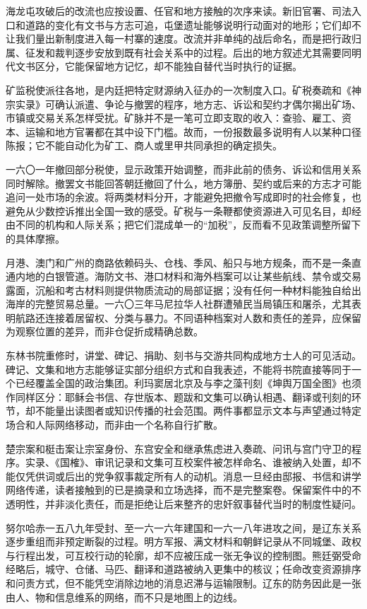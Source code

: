 海龙屯攻破后的改流也应按设置、任官和地方接触的次序来读。新旧官署、司法入口和道路的变化有文书与方志可追，屯堡遗址能够说明行动面对的地形；它们却不让我们量出新制度进入每一村寨的速度。改流并非单纯的战后命名，而是把行政归属、征发和裁判逐步安放到既有社会关系中的过程。后出的地方叙述尤其需要同明代文书区分，它能保留地方记忆，却不能独自替代当时执行的证据。

矿监税使派往各地，是内廷把特定财源纳入征办的一次制度入口。矿税奏疏和《神宗实录》可确认派遣、争论与撤罢的程序，地方志、诉讼和契约才偶尔揭出矿场、市镇或交易关系怎样受扰。矿脉并不是一笔可立即支取的收入：查验、雇工、资本、运输和地方官署都在其中设下门槛。故而，一份报数最多说明有人以某种口径陈报；它不能自动化为矿工、商人或里甲共同承担的确定损失。

一六〇一年撤回部分税使，显示政策开始调整，而非此前的债务、诉讼和信用关系同时解除。撤罢文书能回答朝廷撤回了什么，地方簿册、契约或后来的方志才可能追问一处市场的余波。将两类材料分开，才能避免把撤令写成即时的社会修复，也避免从少数控诉推出全国一致的感受。矿税与一条鞭都使资源进入可见名目，却经由不同的机构和人际关系；把它们混成单一的“加税”，反而看不见政策调整所留下的具体摩擦。

月港、澳门和广州的商路依赖码头、仓栈、季风、船只与地方规条，而不是一条直通内地的白银管道。海防文书、港口材料和海外档案可以让某些航线、禁令或交易露面，沉船和考古材料则提供物质流动的局部证据；没有任何一种材料能独自给出海岸的完整贸易总量。一六〇三年马尼拉华人社群遭殖民当局镇压和屠杀，尤其表明航路还连接着居留权、分类与暴力。不同语种档案对人数和责任的差异，应保留为观察位置的差异，而非仓促折成精确总数。

东林书院重修时，讲堂、碑记、捐助、刻书与交游共同构成地方士人的可见活动。碑记、文集和地方志能够证实部分组织方式和自我表述，不能将书院直接等同于一个已经覆盖全国的政治集团。利玛窦居北京及与李之藻刊刻《坤舆万国全图》也须作同样区分：耶稣会书信、存世版本、题跋和文集可以确认相遇、翻译或刊刻的环节，却不能量出读图者或知识传播的社会范围。两件事都显示文本与声望通过特定场合和人际网络移动，而非由一个名称自行扩散。

楚宗案和梃击案让宗室身份、东宫安全和继承焦虑进入奏疏、问讯与宫门守卫的程序。实录、《国榷》、审讯记录和文集可互校案件被怎样命名、谁被纳入处置，却不能仅凭供词或后出的党争叙事裁定所有人的动机。消息一旦经由邸报、书信和讲学网络传递，读者接触到的已是摘录和立场选择，而不是完整案卷。保留案件中的不透明性，并非淡化责任，而是拒绝让后来整齐的忠奸叙事替代当时的制度性疑问。

努尔哈赤一五八九年受封、至一六一六年建国和一六一八年进攻之间，是辽东关系逐步重组而非预定断裂的过程。明方军报、满文材料和朝鲜记录从不同城堡、政权与行程出发，可互校行动的轮廓，却不应被压成一张无争议的控制图。熊廷弼受命经略后，城守、仓储、马匹、翻译和道路被纳入更集中的核议；任命改变资源排序和问责方式，但不能凭空消除边地的消息迟滞与运输限制。辽东的防务因此是一张由人、物和信息维系的网络，而不只是地图上的边线。

